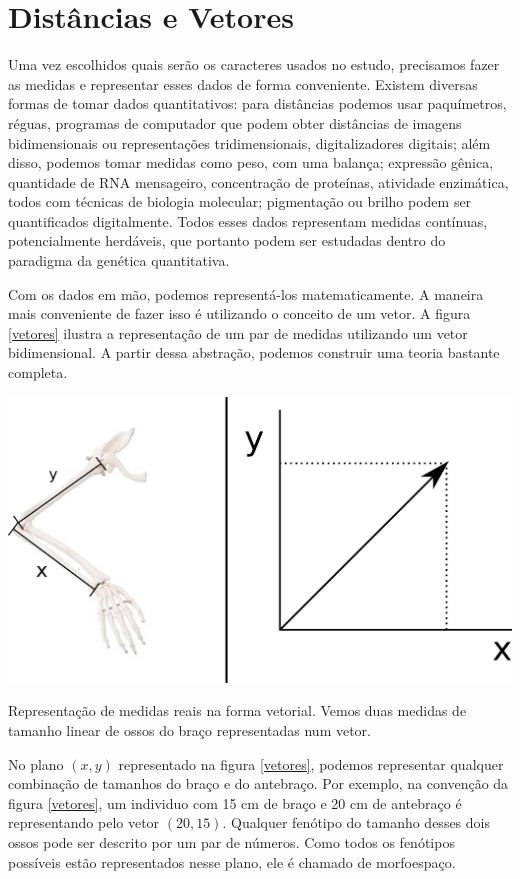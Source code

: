 \documentclass[portuges,]{tufte-handout}
\begin{document}
\section{Distâncias e Vetores}\label{distuxe2ncias-e-vetores}

Uma vez escolhidos quais serão os caracteres usados no estudo,
precisamos fazer as medidas e representar esses dados de forma
conveniente. Existem diversas formas de tomar dados quantitativos: para
distâncias podemos usar paquímetros, réguas, programas de computador que
podem obter distâncias de imagens bidimensionais ou representações
tridimensionais, digitalizadores digitais; além disso, podemos tomar
medidas como peso, com uma balança; expressão gênica, quantidade de RNA
mensageiro, concentração de proteínas, atividade enzimática, todos com
técnicas de biologia molecular; pigmentação ou brilho podem ser
quantificados digitalmente. Todos esses dados representam medidas
contínuas, potencialmente herdáveis, que portanto podem ser estudadas
dentro do paradigma da genética quantitativa.

Com os dados em mão, podemos representá-los matematicamente. A maneira
mais conveniente de fazer isso é utilizando o conceito de um vetor. A
figura \ref{vetores} ilustra a representação de um par de medidas
utilizando um vetor bidimensional. A partir dessa abstração, podemos
construir uma teoria bastante completa.

\begin{marginfigure}
\includegraphics{./figuras/medidas-vetores.png}
\caption{Representação de medidas reais na forma vetorial.
Vemos duas medidas de tamanho linear de ossos do braço representadas num
vetor.}
\label{vetores}
\end{marginfigure}

No plano \((x,y)\) representado na figura \ref{vetores}, podemos
representar qualquer combinação de tamanhos do braço e do antebraço. Por
exemplo, na convenção da figura \ref{vetores}, um individuo com 15 cm de
braço e 20 cm de antebraço é representando pelo vetor \((20, 15)\).
Qualquer fenótipo do tamanho desses dois ossos pode ser descrito por um
par de números. Como todos os fenótipos possíveis estão representados
nesse plano, ele é chamado de morfoespaço.
\end{document}
